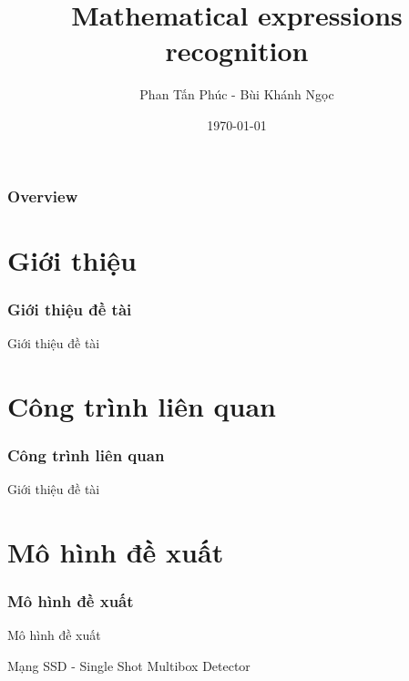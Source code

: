 \documentclass{beamer}
\title[Mathematical expressions recognition]{Mathematical expressions recognition }
\author{Phan Tấn Phúc - Bùi Khánh Ngọc} %
\institute[BKU] %
{
	Ho Chi Minh City University of Technology \\ %
	\medskip
	\textit{\{phantanphuc2512, buikhanhngoc142\}@gmail.com} %
}
\date{\today} %
\begin{document}
	
	\begin{frame}
		\titlepage %
	\end{frame}
	
	\begin{frame}
		\frametitle{Overview} %
		\tableofcontents %
	\end{frame}
	
	
	
	
	\section{Giới thiệu}
	
	\begin{frame}
		\frametitle{Giới thiệu đề tài}
		{\Huge Giới thiệu đề tài}
	\end{frame}
	
	
	\section{Công trình liên quan}
	\begin{frame}
		\frametitle{Công trình liên quan}
		{\Huge Giới thiệu đề tài}
	\end{frame}
	
	
	
	\section{Mô hình đề xuất}
	\begin{frame}
		\frametitle{Mô hình đề xuất}
		{\Huge Mô hình đề xuất}
		\hspace{10 cm}
		
		
		
		
		Mạng SSD - Single Shot Multibox Detector
	\end{frame}
	
\end{document}
